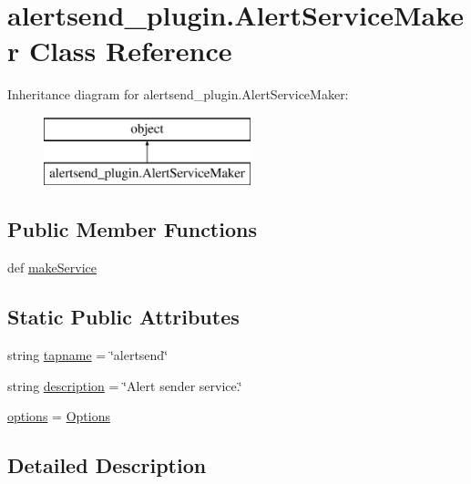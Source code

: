 \hypertarget{classalertsend__plugin_1_1_alert_service_maker}{\section{alertsend\-\_\-plugin.\-Alert\-Service\-Maker Class Reference}
\label{classalertsend__plugin_1_1_alert_service_maker}
}
Inheritance diagram for alertsend\-\_\-plugin.\-Alert\-Service\-Maker\-:\begin{figure}[H]
\begin{center}
\leavevmode
\includegraphics[height=2.000000cm]{da/d44/classalertsend__plugin_1_1_alert_service_maker}
\end{center}
\end{figure}
\subsection*{Public Member Functions}
\begin{DoxyCompactItemize}
\item 
def \hyperlink{classalertsend__plugin_1_1_alert_service_maker_a776ab9354d7bb4157ccd80edf7bb0826}{make\-Service}
\end{DoxyCompactItemize}
\subsection*{Static Public Attributes}
\begin{DoxyCompactItemize}
\item 
string \hyperlink{classalertsend__plugin_1_1_alert_service_maker_abf35c4fc0c983dfca5201f25cb643a1a}{tapname} = \char`\"{}alertsend\char`\"{}
\item 
string \hyperlink{classalertsend__plugin_1_1_alert_service_maker_ae4010cf4a7c97046d526cee0b1febcf2}{description} = \char`\"{}Alert sender service.\char`\"{}
\item 
\hyperlink{classalertsend__plugin_1_1_alert_service_maker_a3ca254bf6fd586ded22ae26866a8dbb9}{options} = \hyperlink{classalertsend__plugin_1_1_options}{Options}
\end{DoxyCompactItemize}


\subsection{Detailed Description}


